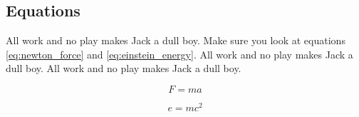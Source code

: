 
%
%

%
%

\subsection{Equations}
\label{sec:discussion_equations}

All work and no play makes Jack a dull boy.
Make sure you look at equations
\ref{eq:newton_force} and
\ref{eq:einstein_energy}.
All work and no play makes Jack a dull boy.
All work and no play makes Jack a dull boy.

\begin{equation}
\label{eq:newton_force}
F = m a
\end{equation}

\begin{equation}
\label{eq:einstein_energy}
e = m c ^ 2
\end{equation}
